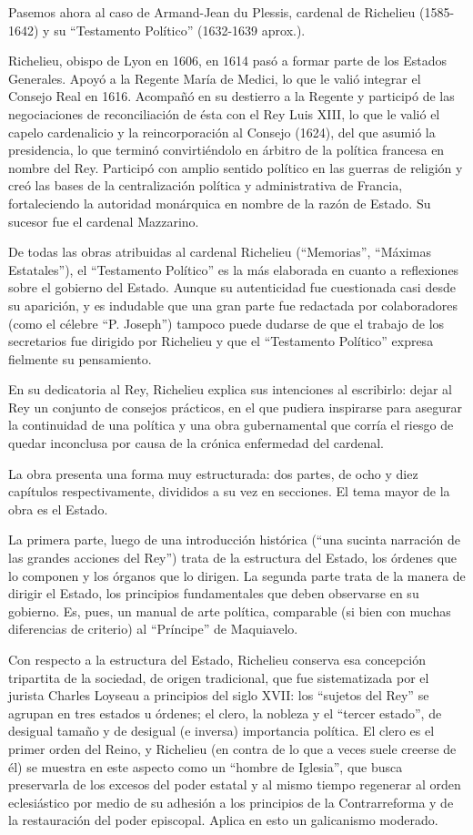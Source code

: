 \documentclass[
]{book}
\begin{document}
Pasemos ahora al caso de Armand-Jean du Plessis, cardenal de Richelieu (1585-1642) y su ``Testamento Político'' (1632-1639 aprox.).

Richelieu, obispo de Lyon en 1606, en 1614 pasó a formar parte de los Estados Generales. Apoyó a la Regente María de Medici, lo que le valió integrar el Consejo Real en 1616. Acompañó en su destierro a la Regente y participó de las negociaciones de reconciliación de ésta con el Rey Luis XIII, lo que le valió el capelo cardenalicio y la reincorporación al Consejo (1624), del que asumió la presidencia, lo que terminó convirtiéndolo en árbitro de la política francesa en nombre del Rey. Participó con amplio sentido político en las guerras de religión y creó las bases de la centralización política y administrativa de Francia, fortaleciendo la autoridad monárquica en nombre de la razón de Estado. Su sucesor fue el cardenal Mazzarino.

De todas las obras atribuidas al cardenal Richelieu (``Memorias'', ``Máximas Estatales''), el ``Testamento Político'' es la más elaborada en cuanto a reflexiones sobre el gobierno del Estado. Aunque su autenticidad fue cuestionada casi desde su aparición, y es indudable que una gran parte fue redactada por colaboradores (como el célebre ``P. Joseph'') tampoco puede dudarse de que el trabajo de los secretarios fue dirigido por Richelieu y que el ``Testamento Político'' expresa fielmente su pensamiento.

En su dedicatoria al Rey, Richelieu explica sus intenciones al escribirlo: dejar al Rey un conjunto de consejos prácticos, en el que pudiera inspirarse para asegurar la continuidad de una política y una obra gubernamental que corría el riesgo de quedar inconclusa por causa de la crónica enfermedad del cardenal.

La obra presenta una forma muy estructurada: dos partes, de ocho y diez capítulos respectivamente, divididos a su vez en secciones. El tema mayor de la obra es el Estado.

La primera parte, luego de una introducción histórica (``una sucinta narración de las grandes acciones del Rey'') trata de la estructura del Estado, los órdenes que lo componen y los órganos que lo dirigen. La segunda parte trata de la manera de dirigir el Estado, los principios fundamentales que deben observarse en su gobierno. Es, pues, un manual de arte política, comparable (si bien con muchas diferencias de criterio) al ``Príncipe'' de Maquiavelo.

Con respecto a la estructura del Estado, Richelieu conserva esa concepción tripartita de la sociedad, de origen tradicional, que fue sistematizada por el jurista Charles Loyseau a principios del siglo XVII: los ``sujetos del Rey'' se agrupan en tres estados u órdenes; el clero, la nobleza y el ``tercer estado'', de desigual tamaño y de desigual (e inversa) importancia política. El clero es el primer orden del Reino, y Richelieu (en contra de lo que a veces suele creerse de él) se muestra en este aspecto como un ``hombre de Iglesia'', que busca preservarla de los excesos del poder estatal y al mismo tiempo regenerar al orden eclesiástico por medio de su adhesión a los principios de la Contrarreforma y de la restauración del poder episcopal. Aplica en esto un galicanismo moderado.
\end{document}
